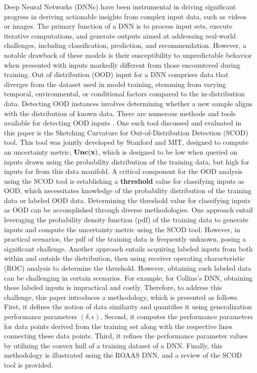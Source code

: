\newtheorem{definition}{Definition}
Deep Neural Networks (DNNs) have been instrumental in driving significant
progress in deriving actionable insights from complex input data,
such as videos or images. The primary function of a DNN is to process
input sets, execute iterative computations, and generate outputs aimed
at addressing real-world challenges, including classification, prediction,
and recommendation. However, a notable drawback of these models is
their susceptibility to unpredictable behavior when presented with inputs
markedly different from those encountered during training. Out of distribution
(OOD) input for a DNN comprises data that diverges from
the dataset used in model training, stemming from varying temporal, environmental,
or conditional factors compared to the in-distribution data.
Detecting OOD instances involves determining whether a new sample
aligns with the distribution of known data. There are numerous methods and tools available for detecting OOD inputs \cite{hendrycks2016baseline,ritter2018scalable,abdelzad2019detecting,madras2019detecting}. One such tool discussed and evaluated in this paper is the Sketching Curvature for Out-of-Distribution Detection (SCOD) tool\cite{sharma2021sketching}. This  tool was  jointly developed by Stanford
and MIT, designed to compute an uncertainty metric, $\bf{Unc}(x)$, which is designed to be low when queried on inputs drawn using the probability distribution of the training data, but high for inputs far from this data manifold. A critical component for the OOD analysis using the SCOD tool is establishing a {\bf threshold} value for classifying inputs as OOD, which necessitates knowledge of the probability distribution of the training data or labeled OOD data.  Determining the threshold value for classifying inputs as OOD can be accomplished through diverse methodologies. One approach entail leveraging the probability density function (pdf) of the training data to generate inputs and compute the uncertainty metric using the SCOD tool. However, in practical scenarios, the pdf of the training data is frequently unknown, posing a significant challenge. Another approach entails acquiring labeled inputs from both within and outside the distribution, then using receiver operating characteristic (ROC) analysis to determine the threshold. However, obtaining such labeled data can be challenging in certain scenarios. For example, for Collins's DNN, obtaining these labeled inputs is impractical and costly. Therefore, to address this challenge,  this paper introduces a methodology, which is presented as follows. First, it defines the notion of data similarity and quantifies it using generalization performance parameters $(\delta,\epsilon)$. Second, it computes the performance parameters for data points derived from the training set along with the respective lines connecting these data points. Third, it refines the performance parameter values by utilizing the convex hull of a training dataset of a DNN. Finally, this methodology is illustrated using the ROAAS DNN, and a review of the SCOD tool is provided.

